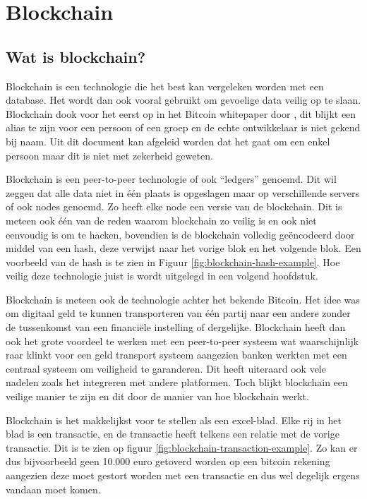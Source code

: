 \chapter{Blockchain}
\label{ch:blockchain}


\section{Wat is blockchain?}

Blockchain is een technologie die het best kan vergeleken worden met een database. Het wordt dan ook vooral gebruikt om gevoelige data veilig op te slaan. Blockchain dook voor het eerst op in het Bitcoin whitepaper door \textcite{Nakamoto2008}, dit blijkt een alias te zijn voor een persoon of een groep en de echte ontwikkelaar is niet gekend bij naam. Uit dit document kan afgeleid worden dat het gaat om een enkel persoon maar dit is niet met zekerheid geweten. 

Blockchain is een peer-to-peer technologie of ook ``ledgers'' genoemd. Dit wil zeggen dat alle data niet in één plaats is opgeslagen maar op verschillende servers of ook nodes genoemd. Zo heeft elke node een versie van de blockchain. Dit is meteen ook één van de reden waarom blockchain zo veilig is en ook niet eenvoudig is om te hacken, bovendien is de blockchain volledig geëncodeerd door middel van een hash, deze verwijst naar het vorige blok en het volgende blok. Een voorbeeld van de hash is te zien in Figuur \ref{fig:blockchain-hash-example}. Hoe veilig deze technologie juist is wordt uitgelegd in een volgend hoofdstuk.

Blockchain is meteen ook de technologie achter het bekende Bitcoin. Het idee was om digitaal geld te kunnen transporteren van één partij naar een andere zonder de tussenkomst van een financiële instelling of dergelijke. Blockchain heeft dan ook het grote voordeel te werken met een peer-to-peer systeem wat waarschijnlijk raar klinkt voor een geld transport systeem aangezien banken werkten met een centraal systeem om veiligheid te garanderen. Dit heeft uiteraard ook vele nadelen zoals het integreren met andere platformen. Toch blijkt blockchain een veilige manier te zijn en dit door de manier van hoe blockchain werkt.

Blockchain is het makkelijkst voor te stellen als een excel-blad. Elke rij in het blad is een transactie, en de transactie heeft telkens een relatie met de vorige transactie. Dit is te zien op figuur \ref{fig:blockchain-transaction-example}. Zo kan er dus bijvoorbeeld geen 10.000 euro getoverd worden op een bitcoin rekening aangezien deze moet gestort worden met een transactie en dus wel degelijk ergens vandaan moet komen.

